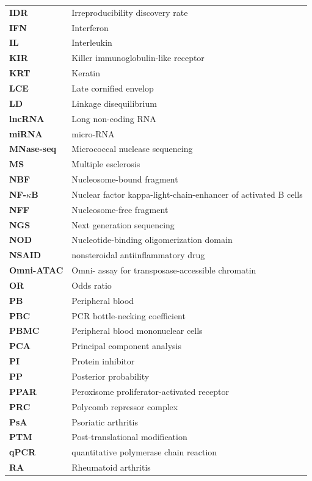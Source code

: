 \begin{longtable}{p{2.5cm}p{12.5cm}}
\textbf{IDR} & Irreproducibility discovery rate\\
\textbf{IFN} & Interferon\\
\textbf{IL} & Interleukin\\
\textbf{KIR} & Killer immunoglobulin-like receptor\\
\textbf{KRT} & Keratin\\
\textbf{LCE} & Late cornified envelop\\
\textbf{LD} & Linkage disequilibrium\\
\textbf{lncRNA} & Long non-coding RNA\\
\textbf{miRNA} & micro-RNA\\
\textbf{MNase-seq} & Micrococcal nuclease sequencing \\
\textbf{MS} & Multiple esclerosis\\
\textbf{NBF} & Nucleosome-bound fragment\\
\textbf{NF-$\kappa$B} & Nuclear factor kappa-light-chain-enhancer of activated B cells \\
\textbf{NFF} & Nucleosome-free fragment\\
\textbf{NGS} & Next generation sequencing\\
\textbf{NOD} & Nucleotide-binding oligomerization domain \\
\textbf{NSAID} & nonsteroidal antiinflammatory drug \\
\textbf{Omni-ATAC} & Omni- assay for transposase-accessible chromatin\\
\textbf{OR} & Odds ratio \\
\textbf{PB} & Peripheral blood \\
\textbf{PBC} & PCR bottle-necking coefficient\\
\textbf{PBMC} & Peripheral blood mononuclear cells \\
\textbf{PCA} & Principal component analysis  \\
\textbf{PI} & Protein inhibitor \\
\textbf{PP} & Posterior probability\\
\textbf{PPAR} & Peroxisome proliferator-activated receptor \\
\textbf{PRC} & Polycomb repressor complex\\
\textbf{PsA}  &Psoriatic arthritis  \\
\textbf{PTM} & Post-translational modification\\
\textbf{qPCR} & quantitative polymerase chain reaction \\
\textbf{RA} & Rheumatoid arthritis \\

\end{longtable}
